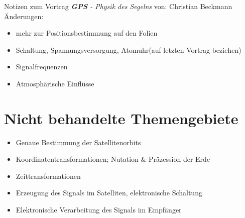 
\newcommand{\ch}{$\checkmark$}

    {\huge Notizen zum Vortrag \textit{\textbf{GPS} - Physik des Segelns}}
    von: Christian Beckmann
    \tableofcontents
    Änderungen:
    \begin{itemize}
        \item mehr zur Positionsbestimmung auf den Folien
        \item Schaltung, Spannungsversorgung, Atomuhr(auf letzten Vortrag beziehen)
        \item Signalfrequenzen
        \item Atmosphärische Einflüsse
    \end{itemize}
    
    \newpage
    
    
    
    
    

    \section{Nicht behandelte Themengebiete}
    \begin{itemize}
        \item Genaue Bestimmung der Satellitenorbits
        \item Koordinatentransformationen; Nutation \& Präzession der Erde
        \item Zeittransformationen
        \item Erzeugung des Signals im Satelliten, elektronische Schaltung
        \item Elektronische Verarbeitung des Signals im Empfänger
    \end{itemize}
    \nocite{*}
    \printbibliography

